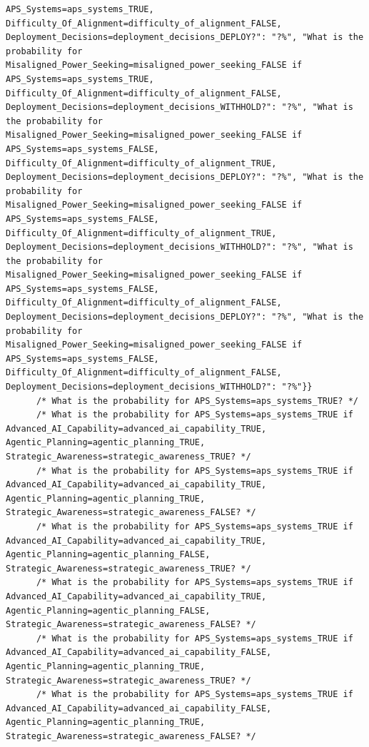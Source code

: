 \documentclass[
  11pt,
  letterpaper,
]{book}
\begin{document}
\begin{verbatim}
APS_Systems=aps_systems_TRUE, Difficulty_Of_Alignment=difficulty_of_alignment_FALSE, Deployment_Decisions=deployment_decisions_DEPLOY?": "?%", "What is the probability for Misaligned_Power_Seeking=misaligned_power_seeking_FALSE if APS_Systems=aps_systems_TRUE, Difficulty_Of_Alignment=difficulty_of_alignment_FALSE, Deployment_Decisions=deployment_decisions_WITHHOLD?": "?%", "What is the probability for Misaligned_Power_Seeking=misaligned_power_seeking_FALSE if APS_Systems=aps_systems_FALSE, Difficulty_Of_Alignment=difficulty_of_alignment_TRUE, Deployment_Decisions=deployment_decisions_DEPLOY?": "?%", "What is the probability for Misaligned_Power_Seeking=misaligned_power_seeking_FALSE if APS_Systems=aps_systems_FALSE, Difficulty_Of_Alignment=difficulty_of_alignment_TRUE, Deployment_Decisions=deployment_decisions_WITHHOLD?": "?%", "What is the probability for Misaligned_Power_Seeking=misaligned_power_seeking_FALSE if APS_Systems=aps_systems_FALSE, Difficulty_Of_Alignment=difficulty_of_alignment_FALSE, Deployment_Decisions=deployment_decisions_DEPLOY?": "?%", "What is the probability for Misaligned_Power_Seeking=misaligned_power_seeking_FALSE if APS_Systems=aps_systems_FALSE, Difficulty_Of_Alignment=difficulty_of_alignment_FALSE, Deployment_Decisions=deployment_decisions_WITHHOLD?": "?%"}}
      /* What is the probability for APS_Systems=aps_systems_TRUE? */
      /* What is the probability for APS_Systems=aps_systems_TRUE if Advanced_AI_Capability=advanced_ai_capability_TRUE, Agentic_Planning=agentic_planning_TRUE, Strategic_Awareness=strategic_awareness_TRUE? */
      /* What is the probability for APS_Systems=aps_systems_TRUE if Advanced_AI_Capability=advanced_ai_capability_TRUE, Agentic_Planning=agentic_planning_TRUE, Strategic_Awareness=strategic_awareness_FALSE? */
      /* What is the probability for APS_Systems=aps_systems_TRUE if Advanced_AI_Capability=advanced_ai_capability_TRUE, Agentic_Planning=agentic_planning_FALSE, Strategic_Awareness=strategic_awareness_TRUE? */
      /* What is the probability for APS_Systems=aps_systems_TRUE if Advanced_AI_Capability=advanced_ai_capability_TRUE, Agentic_Planning=agentic_planning_FALSE, Strategic_Awareness=strategic_awareness_FALSE? */
      /* What is the probability for APS_Systems=aps_systems_TRUE if Advanced_AI_Capability=advanced_ai_capability_FALSE, Agentic_Planning=agentic_planning_TRUE, Strategic_Awareness=strategic_awareness_TRUE? */
      /* What is the probability for APS_Systems=aps_systems_TRUE if Advanced_AI_Capability=advanced_ai_capability_FALSE, Agentic_Planning=agentic_planning_TRUE, Strategic_Awareness=strategic_awareness_FALSE? */

\end{verbatim}
\end{document}
